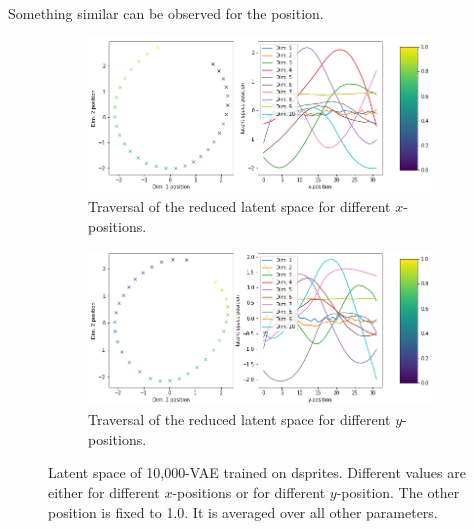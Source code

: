 Something similar can be observed for the position.
\begin{figure}
    \centering
    \begin{subfigure}{.48\textwidth}
        \includegraphics[width=\textwidth]{images/latent_space_traversals/vae_10000_dsprites_latent_space_values_x_position.png}
        \caption{Traversal of the reduced latent space for different $x$-positions.}
        \label{subfig:vae_dsprites_x_pos_latent_space_route}
    \end{subfigure}
    \begin{subfigure}{.48\textwidth}
        \includegraphics[width=\textwidth]{images/latent_space_traversals/vae_10000_dsprites_latent_space_values_y_position.png}
        \caption{Traversal of the reduced latent space for different $y$-positions.}
        \label{subfig:vae_dsprites_y_pos_latent_space_route}
    \end{subfigure}
    \caption[\ac{VAE} on dsprites: Latent Space Values]{Latent space of 10,000-\ac{VAE} trained on dsprites. Different values are either for different $x$-positions or for different $y$-position. The other position is fixed to 1.0. It is averaged over all other parameters.}
    \label{fig:vae_dsprites_latent_space_x_position}
\end{figure}

